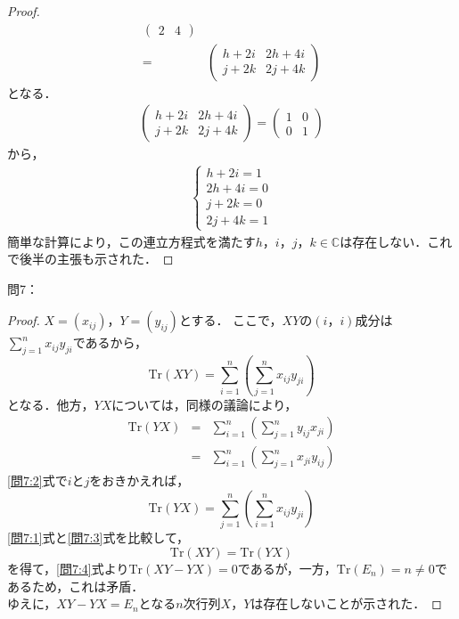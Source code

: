 \documentclass[dvipdfmx,uplatex,11pt]{jsarticle}
\theoremstyle{definition}
\begin{document}
\begin{leftbar}
\begin{proof}
\begin{align}
\begin{pmatrix}
2 & 4
\end{pmatrix}
\\
 =&
\begin{pmatrix}
h+2 i & 2h + 4i \\
j + 2k & 2j +4k
\end{pmatrix}
\end{align}
となる．
\begin{gather*}
\begin{pmatrix}
h+2 i & 2h + 4i \\
j + 2k & 2j +4k
\end{pmatrix}
=
\begin{pmatrix}
1 & 0 \\
0 & 1 
\end{pmatrix}
\end{gather*}
から，
\begin{gather*}
\begin{cases}
h+2 i =1 \\
2h + 4i =0 \\
j + 2k =0 \\
2j +4k =1
\end{cases}
\end{gather*}
簡単な計算により，この連立方程式を満たす$h，i，j，k \in \mathbb{C}$は存在しない．これで後半の主張も示された．
\end{proof}
\end{leftbar}
%
\newpage
\setcounter{equation}{0}
問7：
\begin{leftbar}
\begin{proof}
$X=(x_{ij})$，$Y=(y_{ij})$とする．
ここで，$XY$の$(i，i)$成分は$\sum_{j=1}^{n} x_{ij} y_{ji}$であるから，
\begin{equation}
\label{問7:1}
\mathrm{Tr}(XY)  =  \sum_{i=1}^{n} \left( \sum_{j=1}^{n} x_{ij} y_{ji} \right)
\end{equation}
となる．他方，$YX$については，同様の議論により，
\begin{eqnarray}
\mathrm{Tr} (YX) & = & \sum_{i=1}^{n} \left( \sum_{j=1}^{n}  y_{ij} x_{ji} \right) \nonumber \\
\label{問7:2}
 & = & \sum_{i=1}^{n} \left( \sum_{j=1}^{n}  x_{ji} y_{ij}  \right)
\end{eqnarray}
\eqref{問7:2}式で$i$と$j$をおきかえれば，
\begin{equation}
\label{問7:3}
\mathrm{Tr} (YX) = \sum_{j=1}^{n} \left( \sum_{i=1}^{n}  x_{ij} y_{ji}  \right)
\end{equation}
\eqref{問7:1}式と\eqref{問7:3}式を比較して，
\begin{equation}
\label{問7:4}
\mathrm{Tr} (XY) = \mathrm{Tr} (YX)
\end{equation}
を得て，\eqref{問7:4}式より$\mathrm{Tr} (XY-YX) =0$であるが，一方，$\mathrm{Tr} (E_n) =n \neq 0$であるため，これは矛盾．\\
ゆえに，$XY-YX=E_n$となる$n$次行列$X$，$Y$は存在しないことが示された．
\end{proof}
\end{leftbar}
\end{document}
